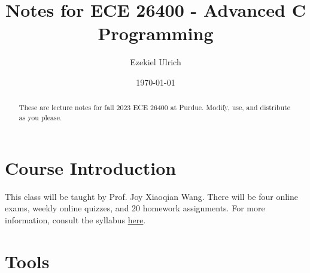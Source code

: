 \documentclass[nobib]{tufte-handout}
\title{Notes for ECE 26400 - Advanced C Programming}
\author[Ezekiel Ulrich]{Ezekiel Ulrich}
\date{\today}  %
\begin{document}
\maketitle

\begin{abstract}
These are lecture notes for fall 2023 ECE 26400 at Purdue. Modify, use, and distribute as you please.
\end{abstract}

\tableofcontents

\pagebreak

\section{Course Introduction}

This class will be taught by Prof. Joy Xiaoqian Wang. There will be four online exams, 
weekly online quizzes, and 20 homework assignments. For more information, 
consult the syllabus \href{https://github.com/ezekielulrich/Notes/blob/d83855d25b40c224ce70b0b46ae6a86adc5a783f/ECE%20264%20Fall%202023%20Syllabus.pdf}{here}.

\section{Tools}
\end{document}

